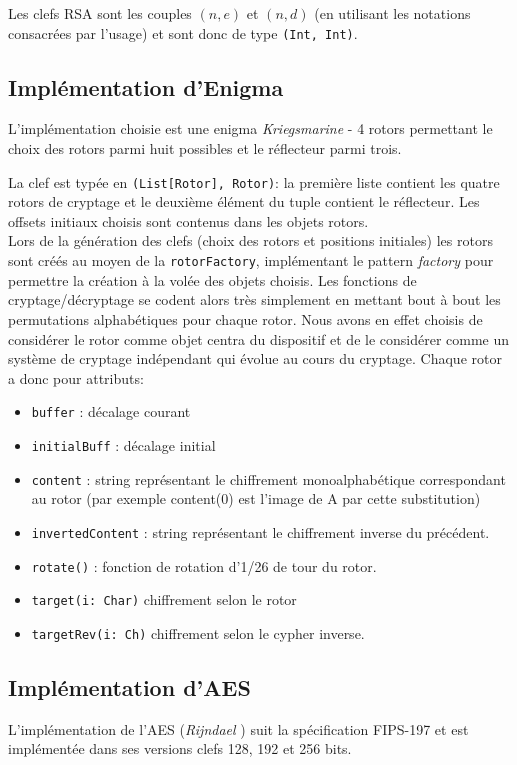 \documentclass[11pt]{article} %
\begin{document}
Les clefs RSA sont les couples $(n,e)$ et $(n,d)$ (en utilisant les notations consacrées par l'usage) et sont donc de type \texttt{(Int, Int)}. 

\subsection{Implémentation d'Enigma}
L’implémentation choisie est une enigma \emph{Kriegsmarine} - 4 rotors permettant le choix des rotors parmi huit possibles et le réflecteur parmi trois.

La clef est typée en \texttt{(List[Rotor], Rotor)}: la première liste contient les quatre rotors de cryptage et le deuxième élément du tuple contient le réflecteur. Les offsets initiaux choisis sont contenus dans les objets rotors.\\


Lors de la génération des clefs (choix des rotors et positions initiales) les rotors sont créés au moyen de la \texttt{rotorFactory}, implémentant le pattern \emph{factory} pour permettre la création à la volée des objets choisis.  Les fonctions de cryptage/décryptage se codent alors très simplement en mettant bout à bout les permutations alphabétiques pour chaque rotor. Nous avons en effet choisis de considérer le rotor comme objet centra du dispositif et de le considérer comme un système de cryptage indépendant qui évolue au cours du cryptage. Chaque rotor a donc pour attributs: 
\begin{itemize}
  \item \texttt{buffer} : décalage courant
  \item \texttt{initialBuff}  : décalage initial
  \item \texttt{content}   : string représentant le chiffrement monoalphabétique correspondant au rotor (par exemple content(0) est l'image de A par cette substitution) 
  \item \texttt{invertedContent} : string représentant le chiffrement inverse du précédent.
  \item \texttt{rotate()} : fonction de rotation d'1/26 de tour du rotor.
  \item \texttt{target(i: Char)}  chiffrement selon le rotor
  \item \texttt{targetRev(i: Ch)} chiffrement selon le cypher inverse.
\end{itemize}

\subsection{Implémentation d'AES}
L'implémentation de l'AES (\emph{Rijndael} ) suit la spécification FIPS-197  et est implémentée dans ses versions clefs 128, 192 et 256 bits.
\end{document}
